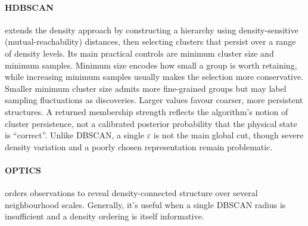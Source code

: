 \begin{center}
    \caption{DBSCAN grows groups through core-point density connectivity, while leaving sufficiently isolated observations unassigned.}\label{fig:dbscan}
\end{center}

\paragraph{HDBSCAN} extends the density approach by constructing a hierarchy using density-sensitive (mutual-reachability) distances, then selecting clusters that persist over a range of density levels.
Its main practical controls are minimum cluster size and minimum samples.
Minimum size encodes how small a group is worth retaining, while increasing minimum samples usually makes the selection more conservative.
Smaller minimum cluster size admits more fine-grained groups but may label sampling fluctuations as discoveries.
Larger values favour coarser, more persistent structures.
A returned membership strength reflects the algorithm's notion of cluster persistence, not a calibrated posterior probability that the physical state is ``correct''.
Unlike DBSCAN, a single $\varepsilon$ is not the main global cut, though severe density variation and a poorly chosen representation remain problematic.
\paragraph{OPTICS} orders observations to reveal density-connected structure over several neighbourhood scales.
Generally, it's useful when a single DBSCAN radius is insufficient and a density ordering is itself informative.


